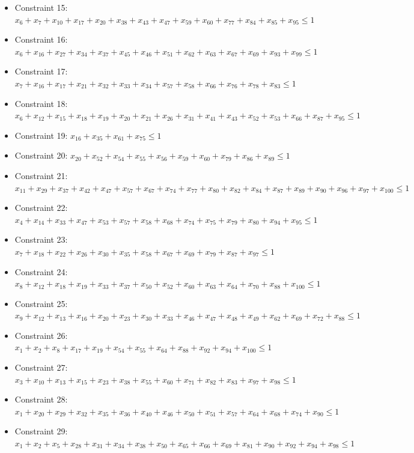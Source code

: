 \documentclass[11pt]{article}
\begin{document}
\begin{itemize}
\item Constraint 15: $x_{6} + x_{7} + x_{10} + x_{17} + x_{20} + x_{38} + x_{43} + x_{47} + x_{59} + x_{60} + x_{77} + x_{84} + x_{85} + x_{95} \le 1$
\item Constraint 16: $x_{6} + x_{16} + x_{27} + x_{34} + x_{37} + x_{45} + x_{46} + x_{51} + x_{62} + x_{63} + x_{67} + x_{69} + x_{93} + x_{99} \le 1$
\item Constraint 17: $x_{7} + x_{16} + x_{17} + x_{21} + x_{32} + x_{33} + x_{34} + x_{57} + x_{58} + x_{66} + x_{76} + x_{78} + x_{83} \le 1$
\item Constraint 18: $x_{6} + x_{12} + x_{15} + x_{18} + x_{19} + x_{20} + x_{21} + x_{26} + x_{31} + x_{41} + x_{43} + x_{52} + x_{53} + x_{66} + x_{87} + x_{95} \le 1$
\item Constraint 19: $x_{16} + x_{35} + x_{61} + x_{75} \le 1$
\item Constraint 20: $x_{20} + x_{52} + x_{54} + x_{55} + x_{56} + x_{59} + x_{60} + x_{79} + x_{86} + x_{89} \le 1$
\item Constraint 21: $x_{11} + x_{29} + x_{37} + x_{42} + x_{47} + x_{57} + x_{67} + x_{74} + x_{77} + x_{80} + x_{82} + x_{84} + x_{87} + x_{89} + x_{90} + x_{96} + x_{97} + x_{100} \le 1$
\item Constraint 22: $x_{4} + x_{14} + x_{33} + x_{47} + x_{53} + x_{57} + x_{58} + x_{68} + x_{74} + x_{75} + x_{79} + x_{80} + x_{94} + x_{95} \le 1$
\item Constraint 23: $x_{7} + x_{18} + x_{22} + x_{26} + x_{30} + x_{35} + x_{58} + x_{67} + x_{69} + x_{79} + x_{87} + x_{97} \le 1$
\item Constraint 24: $x_{8} + x_{12} + x_{18} + x_{19} + x_{33} + x_{37} + x_{50} + x_{52} + x_{60} + x_{63} + x_{64} + x_{70} + x_{88} + x_{100} \le 1$
\item Constraint 25: $x_{9} + x_{12} + x_{13} + x_{16} + x_{20} + x_{23} + x_{30} + x_{33} + x_{46} + x_{47} + x_{48} + x_{49} + x_{62} + x_{69} + x_{72} + x_{88} \le 1$
\item Constraint 26: $x_{1} + x_{2} + x_{8} + x_{17} + x_{19} + x_{54} + x_{55} + x_{64} + x_{88} + x_{92} + x_{94} + x_{100} \le 1$
\item Constraint 27: $x_{3} + x_{10} + x_{13} + x_{15} + x_{23} + x_{38} + x_{55} + x_{60} + x_{71} + x_{82} + x_{83} + x_{97} + x_{98} \le 1$
\item Constraint 28: $x_{1} + x_{20} + x_{29} + x_{32} + x_{35} + x_{36} + x_{40} + x_{46} + x_{50} + x_{51} + x_{57} + x_{64} + x_{68} + x_{74} + x_{90} \le 1$
\item Constraint 29: $x_{1} + x_{2} + x_{5} + x_{28} + x_{31} + x_{34} + x_{38} + x_{50} + x_{65} + x_{66} + x_{69} + x_{81} + x_{90} + x_{92} + x_{94} + x_{98} \le 1$

\end{itemize}
\end{document}
